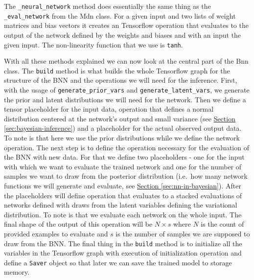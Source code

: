 \documentclass[12pt,a4paper,twoside]{scrartcl}
\numberwithin{equation}{section}
\newcommand{\refsec}[1]{\hyperref[#1]{Section \ref*{#1}}}
\begin{document}
The \texttt{\_neural\_network} method does essentially the same thing as the \texttt{\_eval\_network} from the Mdn class. For a given input and two lists of weight matrices and bias vectors it creates an Tensorflow operation that evaluates to the output of the network defined by the weights and biases and with an input the given input. The non-linearity function that we use is \texttt{tanh}. 

With all these methods explained we can now look at the central part of the Bnn class. The \texttt{build} method is what builds the whole Tensorflow graph for the structure of the BNN and the operations we will need for the inference. First, with the usage of \texttt{generate\_prior\_vars} and \texttt{generate\_latent\_vars}, we generate the prior and latent distributions we will need for the network. Then we define a tensor placeholder for the input data, operation that defines a normal distribution centered at the network's output and small variance (see \refsec{sec:bayesian-inference}) and a placeholder for the actual observed output data. To note is that here we use the prior distributions while we define the network operation. The next step is to define the operation necessary for the evaluation of the BNN with new data. For that we define two placeholders - one for the input with which we want to evaluate the trained network and one for the number of samples we want to draw from the posterior distribution (i.e.\ how many network functions we will generate and evaluate, see \refsec{sec:nn-in-bayesian}). After the placeholders will define operation that evaluates to a stacked evaluations of networks defined with draws from the latent variables defining the variational distribution. To note is that we evaluate each network on the whole input. The final shape of the output of this operation will be  \(N \times s\) where \(N\) is the count of provided examples to evaluate and \(s\) is the number of samples we are supposed to draw from the BNN. The final thing in the \texttt{build} method is to initialize all the variables in the Tensorflow graph with execution of initialization operation and define a \texttt{Saver} object so that later we can save the trained model to storage memory.
\end{document}
